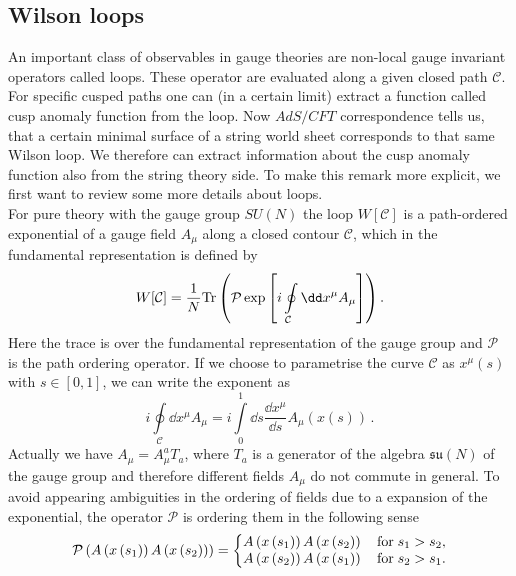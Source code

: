\subsection{Wilson loops}
%
An important class of observables in gauge theories are non-local gauge invariant operators called  loops. These operator are evaluated along a given closed path $\mathcal{C}$. For specific cusped paths one can (in a certain limit) extract a function called cusp anomaly function from the  loop. Now $AdS/CFT$ correspondence tells us, that a certain minimal surface of a string world sheet corresponds to that same Wilson loop. We therefore can extract information about the cusp anomaly function also from the string theory side. To make this remark more explicit, we first want to review some more details about  loops.\\
For pure  theory with the gauge group $SU(N)$ the  loop $W[\mathcal{C}]$ is a path-ordered exponential of a gauge field $A_{\mu}$ along a closed contour $\mathcal{C}$, which in the fundamental representation is defined by
%
%
\begin{equation}
W[\mathcal{C}] = \frac{1}{N}{\rm Tr} \left( \mathcal{P} \exp \left[ i \oint\limits_{\mathcal{C}} \dd x^{\mu}A_{\mu} \right] \right).
\end{equation}
%
%
Here the trace is over the fundamental representation of the gauge group and $\mathcal{P}$ is the path ordering operator. If we choose to parametrise the curve $\mathcal{C}$ as $x^{\mu}(s)$ with $s \in [0,1]$, we can write the exponent as
\begin{equation}
 i \oint\limits_{\mathcal{C}} \dd x^{\mu}A_{\mu} =  i \int\limits_{0}^{1} \dd s \frac{\dd x^{\mu}}{\dd s} A_{\mu}\left(x\left(s \right)\right)\,.
\end{equation}
Actually we have $A_{\mu}=A_{\mu}^{a}T_{a}$, where $T_{a}$ is a generator of the  algebra $\mathfrak{su}(N)$ of the gauge group and therefore different fields $A_{\mu}$ do not commute in general. To avoid appearing ambiguities in the ordering of fields due to a  expansion of the exponential, the operator $\mathcal{P}$ is ordering them in the following sense
\begin{equation}
\mathcal{P}\left( A\left(x\left(s_{1}\right)\right) A\left(x\left(s_{2}\right)\right) \right)
= \left\lbrace \begin{matrix}
A\left(x\left(s_{1}\right)\right) A\left(x\left(s_{2}\right)\right) \quad {\rm for} \; s_{1}>s_{2},  \\ 
A\left(x\left(s_{2}\right)\right) A\left(x\left(s_{1}\right)\right) \quad {\rm for} \; s_{2}>s_{1}.
\end{matrix} \right.
\end{equation}
%
%
%
